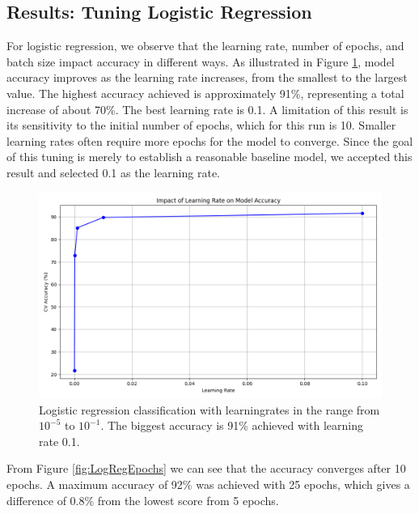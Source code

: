 \subsection{Results: Tuning Logistic Regression }
For logistic regression, we observe that the learning rate, number of epochs, and batch size impact accuracy in different ways. As illustrated in Figure \ref{fig:LogRegLearningRate}, model accuracy improves as the learning rate increases, from the smallest to the largest value. The highest accuracy achieved is approximately 91\%, representing a total increase of about 70\%. The best learning rate is 0.1. A limitation of this result is its sensitivity to the initial number of epochs, which for this run is 10. Smaller learning rates often require more epochs for the model to converge. Since the goal of this tuning is merely to establish a reasonable baseline model, we accepted this result and selected 0.1 as the learning rate.

\begin{figure}[H]
    \centering
    \includegraphics[width=\textwidth]{results/logreg/learning_rate_study.png}
    \caption{Logistic regression classification with learningrates in the range from $10^{-5}$ to $10^{-1}$. The biggest accuracy is 91\% achieved with learning rate 0.1.}
    \label{fig:LogRegLearningRate}
\end{figure}

\newpage
From Figure \ref{fig:LogRegEpochs} we can see that the accuracy converges after 10 epochs. A maximum accuracy of 92\% was achieved with 25 epochs, which gives a difference of 0.8\% from the lowest score from 5 epochs. 

